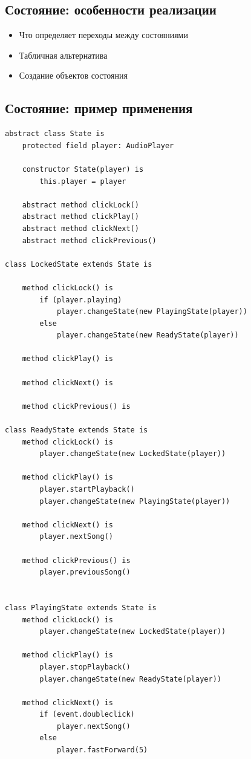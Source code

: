 \subsection{Состояние: особенности реализации}
\begin{itemize}
    \item Что определяет переходы между состояниями
    \item Табличная альтернатива
    \item Создание объектов состояния
\end{itemize}
\subsection{Состояние: пример применения}
\begin{lstlisting}
abstract class State is
    protected field player: AudioPlayer

    constructor State(player) is
        this.player = player

    abstract method clickLock()
    abstract method clickPlay()
    abstract method clickNext()
    abstract method clickPrevious()

class LockedState extends State is

    method clickLock() is
        if (player.playing)
            player.changeState(new PlayingState(player))
        else
            player.changeState(new ReadyState(player))

    method clickPlay() is

    method clickNext() is

    method clickPrevious() is

class ReadyState extends State is
    method clickLock() is
        player.changeState(new LockedState(player))

    method clickPlay() is
        player.startPlayback()
        player.changeState(new PlayingState(player))

    method clickNext() is
        player.nextSong()

    method clickPrevious() is
        player.previousSong()


class PlayingState extends State is
    method clickLock() is
        player.changeState(new LockedState(player))

    method clickPlay() is
        player.stopPlayback()
        player.changeState(new ReadyState(player))

    method clickNext() is
        if (event.doubleclick)
            player.nextSong()
        else
            player.fastForward(5)


\end{lstlisting}
